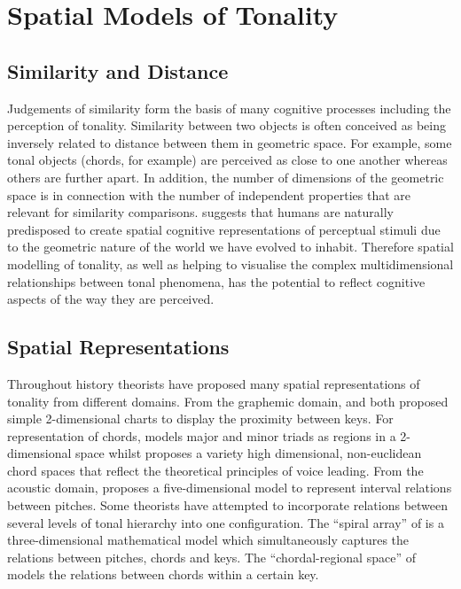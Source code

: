 \documentclass{article}
\begin{document}
\section{Spatial Models of Tonality}
\label{sec-5}
\subsection{Similarity and Distance}
\label{sec-5-1}

Judgements of similarity form the basis of many cognitive processes
including the perception of tonality. Similarity between two objects
is often conceived as being inversely related to distance between them
in geometric space. For example, some tonal objects (chords, for
example) are perceived as close to one another whereas others are
further apart. In addition, the number of dimensions of the geometric
space is in connection with the number of independent properties that
are relevant for similarity comparisons. \citet{Gardenfors1995}
suggests that humans are naturally predisposed to create spatial
cognitive representations of perceptual stimuli due to the geometric
nature of the world we have evolved to inhabit. Therefore spatial
modelling of tonality, as well as helping to visualise the complex
multidimensional relationships between tonal phenomena, has the
potential to reflect cognitive aspects of the way they are perceived.
\subsection{Spatial Representations}
\label{sec-5-2}

Throughout history theorists have proposed many spatial
representations of tonality from different domains. From the graphemic
domain, \citet{Weber} and \citet{Schoenberg} both proposed simple
2-dimensional charts to display the proximity between keys. For
representation of chords, \citet{Riemann} models major and minor
triads as regions in a 2-dimensional space whilst \citet{Tymoczko2011}
proposes a variety high dimensional, non-euclidean chord spaces that
reflect the theoretical principles of voice leading. From the acoustic
domain, \citet{Shepard1982} proposes a five-dimensional model to
represent interval relations between pitches. Some theorists have
attempted to incorporate relations between several levels of tonal
hierarchy into one configuration. The ``spiral array'' of
\citet{Chew2000a} is a three-dimensional mathematical model which
simultaneously captures the relations between pitches, chords and
keys. The ``chordal-regional space'' of \citet{Lerdahl2001a} models the
relations between chords within a certain key.
\end{document}
